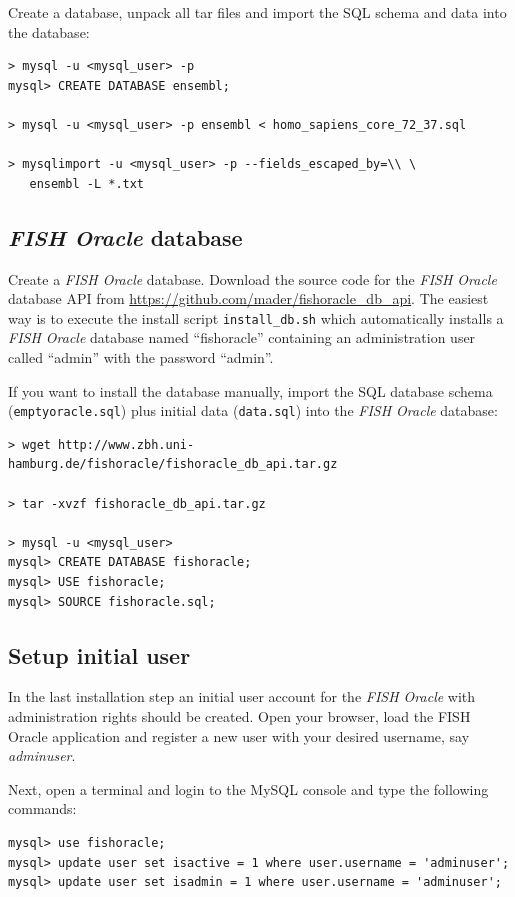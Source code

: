 \documentclass[11pt,final]{article}
\newcommand{\FO}[0]{\emph{FISH Oracle}\xspace}
\begin{document}
Create a database, unpack all tar files and import the SQL schema and data
into the database:

\begin{lstlisting}
> mysql -u <mysql_user> -p
mysql> CREATE DATABASE ensembl;

> mysql -u <mysql_user> -p ensembl < homo_sapiens_core_72_37.sql

> mysqlimport -u <mysql_user> -p --fields_escaped_by=\\ \
   ensembl -L *.txt
\end{lstlisting}

\subsection{\FO database}

Create a \FO database. Download the source code for the \FO database API from
\url{https://github.com/mader/fishoracle_db_api}. The easiest way is to
execute the install script \texttt{install\_db.sh} which automatically
installs a \FO database named ``fishoracle'' containing an administration user
called ``admin'' with the password ``admin''.

If you want to install the database manually, import the SQL database schema
(\texttt{emptyoracle.sql}) plus initial data (\texttt{data.sql}) into the
\FO database:

\begin{lstlisting}
> wget http://www.zbh.uni-hamburg.de/fishoracle/fishoracle_db_api.tar.gz

> tar -xvzf fishoracle_db_api.tar.gz

> mysql -u <mysql_user>
mysql> CREATE DATABASE fishoracle;
mysql> USE fishoracle;
mysql> SOURCE fishoracle.sql;
\end{lstlisting}

\subsection{Setup initial user}

In the last installation step an initial user account for the \FO with
administration rights should be created. Open your browser, load the FISH
Oracle application and register a new user with your desired username, say
\emph{adminuser}. 

Next, open a terminal and login to the MySQL console and type the following
commands:

\begin{lstlisting}
mysql> use fishoracle;
mysql> update user set isactive = 1 where user.username = 'adminuser';
mysql> update user set isadmin = 1 where user.username = 'adminuser';
\end{lstlisting}
\end{document}
